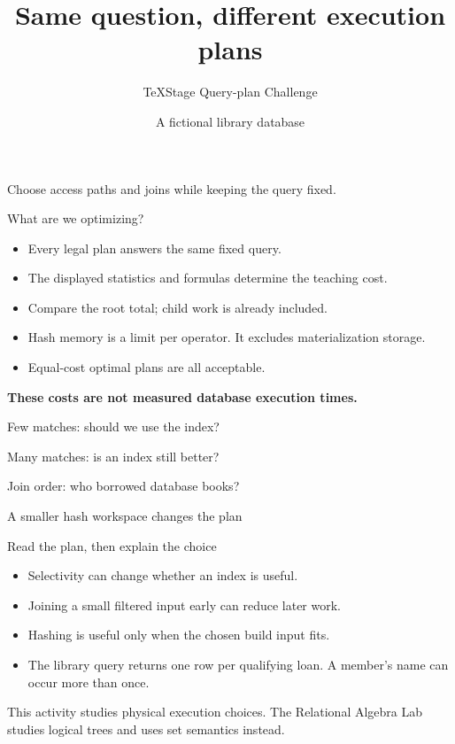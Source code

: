 \documentclass[aspectratio=169]{beamer}
\title{Same question, different execution plans}
\subtitle{TeXStage Query-plan Challenge}
\author{A fictional library database}
\date{}
\begin{document}
\begin{frame}
\titlepage
\small Choose access paths and joins while keeping the query fixed.
\end{frame}
\begin{frame}{What are we optimizing?}
\begin{itemize}
\item Every legal plan answers the same fixed query.
\item The displayed statistics and formulas determine the teaching cost.
\item Compare the root total; child work is already included.
\item Hash memory is a limit per operator. It excludes materialization storage.
\item Equal-cost optimal plans are all acceptable.
\end{itemize}
\medskip
\textbf{These costs are not measured database execution times.}
\end{frame}
\begin{frame}{Few matches: should we use the index?}
\end{frame}
\begin{frame}{Many matches: is an index still better?}
\end{frame}
\begin{frame}{Join order: who borrowed database books?}
\end{frame}
\begin{frame}{A smaller hash workspace changes the plan}
\end{frame}
\begin{frame}{Read the plan, then explain the choice}
\begin{itemize}
\item Selectivity can change whether an index is useful.
\item Joining a small filtered input early can reduce later work.
\item Hashing is useful only when the chosen build input fits.
\item The library query returns one row per qualifying loan.
      A member's name can occur more than once.
\end{itemize}
\medskip
This activity studies physical execution choices. The Relational Algebra Lab
studies logical trees and uses set semantics instead.
\end{frame}
\end{document}
